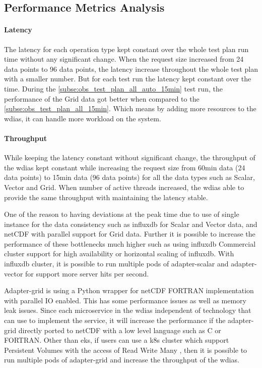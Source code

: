 \documentclass[conference]{IEEEtran}
\begin{document}
\subsection{Performance Metrics Analysis}
\label{psubse:performance_metrics}
\paragraph{Latency}
The latency for each operation type kept constant over the whole test plan run time without any significant change. When the request size increased from 24 data points to 96 data points, the latency increase throughout the whole test plan with a smaller number. But for each test run the latency kept constant over the time.
During the \cref{subse:obs_test_plan_all_auto_15min} test run, the performance of the Grid data got better when compared to the \cref{subse:obs_test_plan_all_15min}. Which means by adding more resources to the \acrshort{wdias}, it can handle more workload on the system.

\paragraph{Throughput}
While keeping the latency constant without significant change, the throughput of the \acrshort{wdias} kept constant while increasing the request size from 60min data (24 data points) to 15min data (96 data points) for all the data types such as Scalar, Vector and Grid.
When number of active threads increased, the \acrshort{wdias} able to provide the same throughput with maintaining the latency stable.

One of the reason to having deviations at the peak time due to use of single instance for the data consistency such as \acrshort{influxdb} for Scalar and Vector data, and netCDF with parallel support for Grid data. Further it is possible to increase the performance of these bottlenecks much higher such as using \acrshort{influxdb} Commercial cluster support for high availability or horizontal scaling of \acrshort{influxdb}. With \acrshort{influxdb} cluster, it is possible to run multiple pods of adapter-scalar and adapter-vector for support more server hits per second.

Adapter-grid is using a Python wrapper for netCDF FORTRAN implementation with parallel IO enabled. This has some performance issues as well as memory leak issues. Since each microservice in the \acrshort{wdias} independent of technology that can use to implement the service, it will increase the performance if the adapter-grid directly ported to netCDF with a low level language such as C or FORTRAN.
Other than \acrshort{eks}, if users can use a \acrshort{k8s} cluster which support Persistent Volumes with the access of Read Write  Many \cite{LinuxFoundationPersistentKubernetes} , then it is possible to run multiple pods of adapter-grid and increase the throughput of the \acrshort{wdias}.
\end{document}

